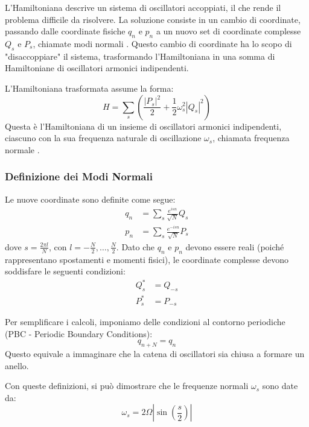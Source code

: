 L'Hamiltoniana descrive un sistema di oscillatori accoppiati, il che rende il problema difficile da risolvere. La soluzione consiste in un cambio di coordinate, passando dalle coordinate fisiche $q_n$ e $p_n$ a un nuovo set di coordinate complesse $Q_s$ e $P_s$, chiamate modi normali . Questo cambio di coordinate ha lo scopo di "disaccoppiare" il sistema, trasformando l'Hamiltoniana in una somma di Hamiltoniane di oscillatori armonici indipendenti.

L'Hamiltoniana trasformata assume la forma:
\begin{equation}
    H = \sum_s \left( \frac{|P_s|^2}{2} + \frac{1}{2}\omega_s^2 |Q_s|^2 \right)
\end{equation}
Questa è l'Hamiltoniana di un insieme di oscillatori armonici indipendenti, ciascuno con la sua frequenza naturale di oscillazione $\omega_s$, chiamata frequenza normale .

\subsubsection{Definizione dei Modi Normali}

Le nuove coordinate sono definite come segue:
\begin{align}
    q_n &= \sum_s \frac{e^{isn}}{\sqrt{N}} Q_s \\
    p_n &= \sum_s \frac{e^{-isn}}{\sqrt{N}} P_s
\end{align}
dove $s = \frac{2\pi l}{N}$, con $l = -\frac{N}{2}, \dots, \frac{N}{2}$.
Dato che $q_n$ e $p_n$ devono essere reali (poiché rappresentano spostamenti e momenti fisici), le coordinate complesse devono soddisfare le seguenti condizioni:
\begin{align}
    Q_s^* &= Q_{-s} \\
    P_s^* &= P_{-s}
\end{align}

Per semplificare i calcoli, imponiamo delle condizioni al contorno periodiche  (PBC - Periodic Boundary Conditions):
\begin{equation}
    q_{n+N} = q_n
\end{equation}
Questo equivale a immaginare che la catena di oscillatori sia chiusa a formare un anello.

Con queste definizioni, si può dimostrare che le frequenze normali $\omega_s$ sono date da:
\begin{equation}
    \omega_s = 2\Omega \left| \sin\left(\frac{s}{2}\right) \right|
\end{equation}


